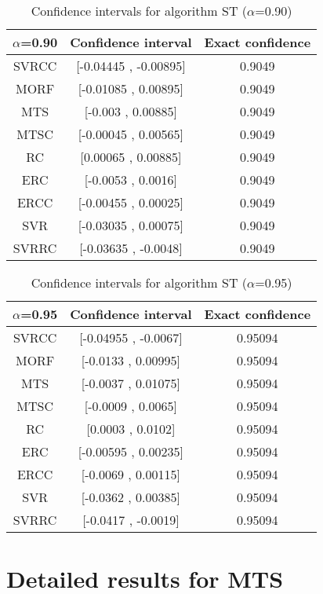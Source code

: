 \documentclass[a4paper,10pt]{article}
\begin{document}
\begin{table}[!htp]
\centering\small
\begin{tabular}{
|c|c|c|}
\hline
 $\alpha$=0.90 & Confidence interval & Exact confidence \\ \hline 
SVRCC & [-0.04445 , -0.00895] & 0.9049\\ \hline 
MORF & [-0.01085 , 0.00895] & 0.9049\\ \hline 
MTS & [-0.003 , 0.00885] & 0.9049\\ \hline 
MTSC & [-0.00045 , 0.00565] & 0.9049\\ \hline 
RC & [0.00065 , 0.00885] & 0.9049\\ \hline 
ERC & [-0.0053 , 0.0016] & 0.9049\\ \hline 
ERCC & [-0.00455 , 0.00025] & 0.9049\\ \hline 
SVR & [-0.03035 , 0.00075] & 0.9049\\ \hline 
SVRRC & [-0.03635 , -0.0048] & 0.9049\\ \hline 

\end{tabular}
\caption{Confidence intervals for algorithm ST ($\alpha$=0.90)}
\end{table}
\begin{table}[!htp]
\centering\small
\begin{tabular}{
|c|c|c|}
\hline
 $\alpha$=0.95 & Confidence interval & Exact confidence \\ \hline 
SVRCC & [-0.04955 , -0.0067] & 0.95094\\ \hline 
MORF & [-0.0133 , 0.00995] & 0.95094\\ \hline 
MTS & [-0.0037 , 0.01075] & 0.95094\\ \hline 
MTSC & [-0.0009 , 0.0065] & 0.95094\\ \hline 
RC & [0.0003 , 0.0102] & 0.95094\\ \hline 
ERC & [-0.00595 , 0.00235] & 0.95094\\ \hline 
ERCC & [-0.0069 , 0.00115] & 0.95094\\ \hline 
SVR & [-0.0362 , 0.00385] & 0.95094\\ \hline 
SVRRC & [-0.0417 , -0.0019] & 0.95094\\ \hline 

\end{tabular}
\caption{Confidence intervals for algorithm ST ($\alpha$=0.95)}
\end{table}

 \clearpage 


\section{Detailed results for MTS}
\end{document}
